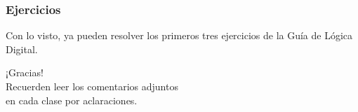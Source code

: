 \documentclass[aspectratio=169]{beamer}
\begin{document}
\begin{frame}[fragile]
    \frametitle{Ejercicios}
    Con lo visto, ya pueden resolver los primeros tres ejercicios de la Guía de Lógica Digital.
\end{frame}

\begin{frame}[plain]
    \begin{center}
    \vspace{2cm}
    \huge ¡Gracias!\\
    \vspace{2cm}
    \normalsize Recuerden leer los comentarios adjuntos\\ en cada clase por aclaraciones.
    \end{center}
\end{frame}
\end{document}

